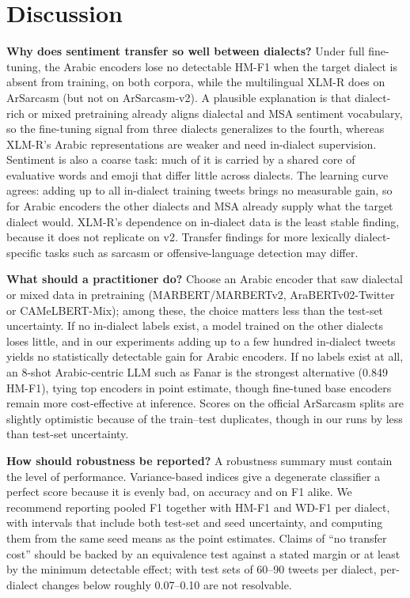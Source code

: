 \documentclass[11pt]{article}
\begin{document}
\section{Discussion}
\label{sec:discussion}
\textbf{Why does sentiment transfer so well between dialects?} Under full fine-tuning, the Arabic encoders lose no detectable HM-F1 when the target dialect is absent from training, on both corpora, while the multilingual XLM-R does on ArSarcasm (but not on ArSarcasm-v2). A plausible explanation is that dialect-rich or mixed pretraining already aligns dialectal and MSA sentiment vocabulary, so the fine-tuning signal from three dialects generalizes to the fourth, whereas XLM-R's Arabic representations are weaker and need in-dialect supervision. Sentiment is also a coarse task: much of it is carried by a shared core of evaluative words and emoji that differ little across dialects. The learning curve agrees: adding up to all in-dialect training tweets brings no measurable gain, so for Arabic encoders the other dialects and MSA already supply what the target dialect would. XLM-R's dependence on in-dialect data is the least stable finding, because it does not replicate on v2. Transfer findings for more lexically dialect-specific tasks such as sarcasm or offensive-language detection may differ.

\textbf{What should a practitioner do?} Choose an Arabic encoder that saw dialectal or mixed data in pretraining (MARBERT/MARBERTv2, AraBERTv02-Twitter or CAMeLBERT-Mix); among these, the choice matters less than the test-set uncertainty. If no in-dialect labels exist, a model trained on the other dialects loses little, and in our experiments adding up to a few hundred in-dialect tweets yields no statistically detectable gain for Arabic encoders. If no labels exist at all, an 8-shot Arabic-centric LLM such as Fanar is the strongest alternative (0.849 HM-F1), tying top encoders in point estimate, though fine-tuned base encoders remain more cost-effective at inference. Scores on the official ArSarcasm splits are slightly optimistic because of the train--test duplicates, though in our runs by less than test-set uncertainty.

\textbf{How should robustness be reported?} A robustness summary must contain the level of performance. Variance-based indices give a degenerate classifier a perfect score because it is evenly bad, on accuracy and on F1 alike. We recommend reporting pooled F1 together with HM-F1 and WD-F1 per dialect, with intervals that include both test-set and seed uncertainty, and computing them from the same seed means as the point estimates. Claims of ``no transfer cost'' should be backed by an equivalence test against a stated margin or at least by the minimum detectable effect; with test sets of 60--90 tweets per dialect, per-dialect changes below roughly 0.07--0.10 are not resolvable.
\end{document}
